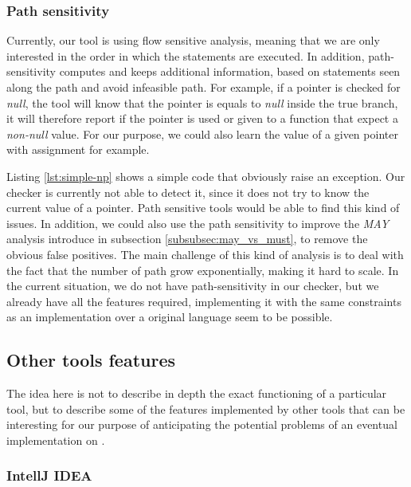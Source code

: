 \subsubsection{Path sensitivity}
\label{subsubsec:path_sensitivity}

Currently, our tool is using flow sensitive analysis, meaning that we are only interested in the order in which the statements are executed.
In addition, path-sensitivity computes and keeps additional information, based on statements seen along the path and avoid infeasible path. 
For example, if a pointer is checked for \emph{null}, the tool will know that the pointer is equals to \emph{null} inside the true branch, it will therefore report if the pointer is used or given to a function that expect a \emph{non-null} value.
For our purpose, we could also learn the value of a given pointer with assignment for example.



Listing \ref{lst:simple-np} shows a simple code that obviously raise an exception. Our checker is currently not able to detect it, since it does not try to know the current value of a pointer.
Path sensitive tools would be able to find this kind of issues.
In addition, we could also use the path sensitivity to improve the \emph{MAY} analysis introduce in subsection \ref{subsubsec:may_vs_must}, to remove the obvious false positives. 
The main challenge of this kind of analysis is to deal with the fact that the number of path grow exponentially, making it hard to scale. 
In the current situation, we do not have path-sensitivity in our checker, but we already have all the features required, implementing it with the same constraints as an implementation over a original language seem to be possible.

\subsection{Other tools features}
\label{subsec:other_tools_features}

The idea here is not to describe in depth the exact functioning of a particular tool, but to describe some of the features implemented by other tools that can be interesting for our purpose of anticipating the potential problems of an eventual implementation on \slang{}.

\subsubsection{IntellJ IDEA}
\label{subsubsec:intellj_idea}

